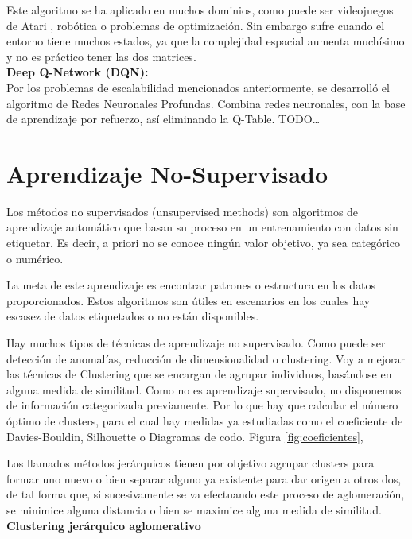 Este algoritmo se ha aplicado en muchos dominios, como puede ser videojuegos de Atari \cite{mnih2013playing}, robótica o problemas de optimización. Sin embargo sufre cuando el entorno tiene muchos estados, ya que la complejidad espacial aumenta muchísimo y no es práctico tener las dos matrices.\\

\noindent \textbf{Deep Q-Network (DQN):}\\
Por los problemas de escalabilidad mencionados anteriormente, se desarrolló el algoritmo de Redes Neuronales Profundas. Combina redes neuronales, con la base de aprendizaje por refuerzo, así eliminando la Q-Table.
\color{blue} TODO… \color{black}


\section{Aprendizaje No-Supervisado}

Los métodos no supervisados (unsupervised methods) son algoritmos de aprendizaje automático que basan su proceso en un entrenamiento con datos sin etiquetar. Es decir, a priori no se conoce ningún valor objetivo, ya sea categórico o numérico. 

La meta de este aprendizaje es encontrar patrones o estructura en los datos proporcionados. Estos algoritmos son útiles en escenarios en los cuales hay escasez de datos etiquetados o no están disponibles.

Hay muchos tipos de técnicas de aprendizaje no supervisado. Como puede ser detección de anomalías, reducción de dimensionalidad o clustering. Voy a mejorar las técnicas de Clustering que se encargan de agrupar individuos, basándose en alguna medida de similitud. Como no es aprendizaje supervisado, no disponemos de información categorizada previamente. Por lo que hay que calcular el número óptimo de clusters, para el cual hay medidas ya estudiadas como el coeficiente de Davies-Bouldin, Silhouette o Diagramas de codo. Figura \ref{fig:coeficientes},

Los llamados métodos jerárquicos \cite{ackermann2014analysis} tienen por objetivo agrupar clusters para formar uno nuevo o bien separar alguno ya existente para dar origen a otros dos, de tal forma que, si sucesivamente se va efectuando este proceso de aglomeración, se minimice alguna distancia o bien se maximice alguna medida de similitud.\\

\noindent \textbf{Clustering jerárquico aglomerativo}\\

